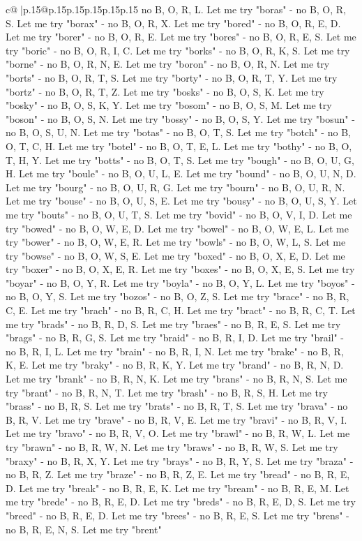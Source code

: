 \documentclass{article}
\begin{document}
{\begin{supertabular}{c@{$\;$}|p{.15\linewidth}@{}p{.15\linewidth}p{.15\linewidth}p{.15\linewidth}p{.15\linewidth}p{.15\linewidth}}
{{{no B, O, R, L. Let me try "boras" {-} no B, O, R, S. Let me try "borax" {-} no B, O, R, X. Let me try "bored" {-} no B, O, R, E, D. Let me try "borer" {-} no B, O, R, E. Let me try "bores" {-} no B, O, R, E, S. Let me try "boric" {-} no B, O, R, I, C. Let me try "borks" {-} no B, O, R, K, S. Let me try "borne" {-} no B, O, R, N, E. Let me try "boron" {-} no B, O, R, N. Let me try "borts" {-} no B, O, R, T, S. Let me try "borty" {-} no B, O, R, T, Y. Let me try "bortz" {-} no B, O, R, T, Z. Let me try "bosks" {-} no B, O, S, K. Let me try "bosky" {-} no B, O, S, K, Y. Let me try "bosom" {-} no B, O, S, M. Let me try "boson" {-} no B, O, S, N. Let me try "bossy" {-} no B, O, S, Y. Let me try "bosun" {-} no B, O, S, U, N. Let me try "botas" {-} no B, O, T, S. Let me try "botch" {-} no B, O, T, C, H. Let me try "botel" {-} no B, O, T, E, L. Let me try "bothy" {-} no B, O, T, H, Y. Let me try "botts" {-} no B, O, T, S. Let me try "bough" {-} no B, O, U, G, H. Let me try "boule" {-} no B, O, U, L, E. Let me try "bound" {-} no B, O, U, N, D. Let me try "bourg" {-} no B, O, U, R, G. Let me try "bourn" {-} no B, O, U, R, N. Let me try "bouse" {-} no B, O, U, S, E. Let me try "bousy" {-} no B, O, U, S, Y. Let me try "bouts" {-} no B, O, U, T, S. Let me try "bovid" {-} no B, O, V, I, D. Let me try "bowed" {-} no B, O, W, E, D. Let me try "bowel" {-} no B, O, W, E, L. Let me try "bower" {-} no B, O, W, E, R. Let me try "bowls" {-} no B, O, W, L, S. Let me try "bowse" {-} no B, O, W, S, E. Let me try "boxed" {-} no B, O, X, E, D. Let me try "boxer" {-} no B, O, X, E, R. Let me try "boxes" {-} no B, O, X, E, S. Let me try "boyar" {-} no B, O, Y, R. Let me try "boyla" {-} no B, O, Y, L. Let me try "boyos" {-} no B, O, Y, S. Let me try "bozos" {-} no B, O, Z, S. Let me try "brace" {-} no B, R, C, E. Let me try "brach" {-} no B, R, C, H. Let me try "bract" {-} no B, R, C, T. Let me try "brads" {-} no B, R, D, S. Let me try "braes" {-} no B, R, E, S. Let me try "brags" {-} no B, R, G, S. Let me try "braid" {-} no B, R, I, D. Let me try "brail" {-} no B, R, I, L. Let me try "brain" {-} no B, R, I, N. Let me try "brake" {-} no B, R, K, E. Let me try "braky" {-} no B, R, K, Y. Let me try "brand" {-} no B, R, N, D. Let me try "brank" {-} no B, R, N, K. Let me try "brans" {-} no B, R, N, S. Let me try "brant" {-} no B, R, N, T. Let me try "brash" {-} no B, R, S, H. Let me try "brass" {-} no B, R, S. Let me try "brats" {-} no B, R, T, S. Let me try "brava" {-} no B, R, V. Let me try "brave" {-} no B, R, V, E. Let me try "bravi" {-} no B, R, V, I. Let me try "bravo" {-} no B, R, V, O. Let me try "brawl" {-} no B, R, W, L. Let me try "brawn" {-} no B, R, W, N. Let me try "braws" {-} no B, R, W, S. Let me try "braxy" {-} no B, R, X, Y. Let me try "brays" {-} no B, R, Y, S. Let me try "braza" {-} no B, R, Z. Let me try "braze" {-} no B, R, Z, E. Let me try "bread" {-} no B, R, E, D. Let me try "break" {-} no B, R, E, K. Let me try "bream" {-} no B, R, E, M. Let me try "brede" {-} no B, R, E, D. Let me try "breds" {-} no B, R, E, D, S. Let me try "breed" {-} no B, R, E, D. Let me try "brees" {-} no B, R, E, S. Let me try "brens" {-} no B, R, E, N, S. Let me try "brent" }}}
\end{supertabular}}
\end{document}
